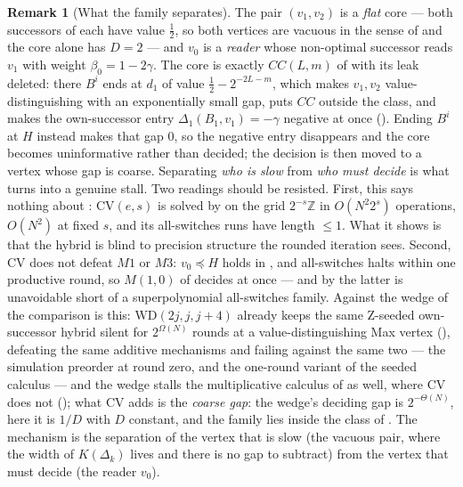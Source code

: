 \documentclass[11pt]{article}
\theoremstyle{plain}
\theoremstyle{definition}
\newtheorem{remark}[theorem]{Remark}
\begin{document}
\begin{remark}[What the family separates]\label{rem:cv}
The pair $(v_1,v_2)$ is a \emph{flat} core --- both successors of each have
value $\tfrac12$, so both vertices are vacuous in the sense of
 and the core alone has $D=2$ --- and $v_0$ is a
\emph{reader} whose non-optimal successor reads $v_1$ with weight
$\beta_0=1-2\gamma$. The core is exactly $CC(L,m)$ of 
with its leak deleted: there $B^{i}$ ends at $d_1$ of value
$\tfrac12-2^{-2L-m}$, which makes $v_1,v_2$ value-distinguishing with an
exponentially small gap, puts $CC$ outside the class, and makes the
own-successor entry $\Delta_1(B_1,v_1)=-\gamma$ negative at once
(). Ending $B^{i}$ at $H$ instead makes
that gap $0$, so the negative entry disappears and the core becomes
uninformative rather than decided; the decision is then moved to a vertex whose
gap is coarse. Separating \emph{who is slow} from \emph{who must decide} is
what turns  into a genuine stall. Two readings should be
resisted. First, this says nothing about :
$\mathrm{CV}(e,s)$ is solved by  on the grid
$2^{-s}\mathbb Z$ in $O(N^{2}2^{s})$ operations, $O(N^{2})$ at fixed $s$, and
its all-switches runs have length $\le1$. What
it shows is that the hybrid is blind to precision structure the rounded
iteration sees. Second, $\mathrm{CV}$ does not defeat $M1$ or $M3$:
$v_0\preceq H$ holds in , and all-switches halts within one
productive round, so $M(1,0)$ of  decides at once --- and by
 the latter is unavoidable short of a superpolynomial
all-switches family.
 Against the wedge of  the comparison is this: $\mathrm{WD}(2j,j,j+4)$
already keeps the same Z-seeded own-successor hybrid silent for
$2^{\Omega(N)}$ rounds at a value-distinguishing Max vertex
(), defeating the same additive
mechanisms and failing against the same two --- the simulation preorder at
round zero, and the one-round variant of the seeded calculus --- and the
wedge stalls the multiplicative calculus of  as well, where
$\mathrm{CV}$ does not (); what
$\mathrm{CV}$ adds is the \emph{coarse gap}: the wedge's deciding gap is
$2^{-\Theta(N)}$, here it is $1/D$ with $D$ constant, and the family lies
inside the class of . The mechanism is the
separation of the vertex that is slow (the vacuous pair, where the width
of $K(\Delta_k)$ lives and there is no gap to subtract) from the vertex
that must decide (the reader $v_0$).
\end{remark}
\end{document}
